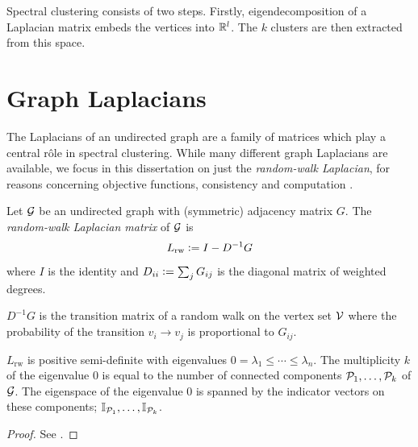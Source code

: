 Spectral clustering consists of two steps. Firstly, eigendecomposition of a Laplacian matrix embeds the vertices into $\mathbb{R}^{l}$. The $k$ clusters are then extracted from this space.










\section{Graph Laplacians} \label{sec:spectral_laplacians}

The Laplacians of an undirected graph are a family of matrices which play a central r\^ole in spectral clustering. While many different graph Laplacians are available, we focus in this dissertation on just the \emph{random-walk Laplacian}, for reasons concerning objective functions, consistency and computation \cite{von2007tutorial, luxburg2004convergence}.


\begin{definition}
Let $\mathcal{G}$ be an undirected graph with (symmetric) adjacency matrix $G$. The \emph{random-walk Laplacian matrix} of $\mathcal{G}$ is
$$ L_\mathrm{rw} \vcentcolon= I - D^{-1} G $$
where $I$ is the identity and $D_{ii} \vcentcolon= \sum_j G_{ij}$ is the diagonal matrix of weighted degrees.
\end{definition}


\begin{remark}
$D^{-1} G$ is the transition matrix of a random walk on the vertex set $\mathcal{V}$ where the probability of the transition $v_i \to v_j$ is proportional to $G_{ij}$.
\end{remark}


\begin{proposition} \label{prop:laplacian}
$L_\mathrm{rw}$ is positive semi-definite with eigenvalues $0 = \lambda_1 \leq \cdots \leq \lambda_n$.
The multiplicity $k$ of the eigenvalue $0$ is equal to the number of connected components $\mathcal{P}_1, \ldots, \mathcal{P}_k$ of $\mathcal{G}$.
The eigenspace of the eigenvalue $0$ is spanned by the indicator vectors on these components; $ \mathbb{I}_{\mathcal{P}_1}, \ldots, \mathbb{I}_{\mathcal{P}_k} $.
\end{proposition}

\begin{proof}
See \cite{von2007tutorial}.
\end{proof}









